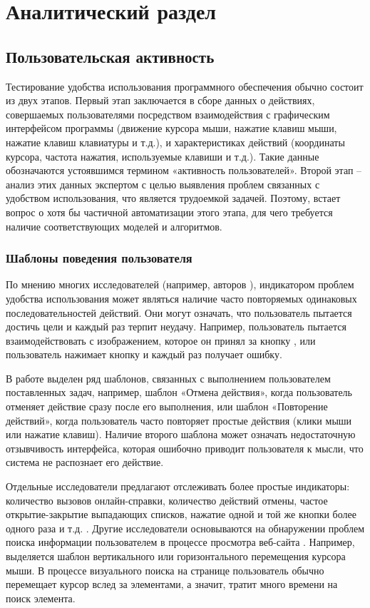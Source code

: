 \chapter{Аналитический раздел}
\label{cha:analysis}

\section{Пользовательская активность}

Тестирование удобства использования программного обеспечения обычно состоит из двух этапов. Первый этап заключается в сборе данных о действиях, совершаемых пользователями посредством взаимодействия с графическим интерфейсом программы (движение курсора мыши, нажатие клавиш мыши, нажатие клавиш клавиатуры и т.д.), и характеристиках действий (координаты курсора, частота нажатия, используемые клавиши и т.д.). Такие данные обозначаются устоявшимся термином «активность пользователей». Второй этап – анализ этих данных экспертом с целью выявления проблем связанных с удобством использования, что является трудоемкой задачей. Поэтому, встает вопрос о хотя бы частичной автоматизации этого этапа, для чего требуется наличие соответствующих моделей и алгоритмов.

\subsection{Шаблоны поведения пользователя}
По мнению многих исследователей (например, авторов \cite{1,4,5,6}), индикатором проблем удобства использования может являться наличие часто повторяемых одинаковых последовательностей действий. Они могут означать, что пользователь пытается достичь цели и каждый раз терпит неудачу. Например, пользователь пытается взаимодействовать с изображением, которое он принял за кнопку \cite{1}, или пользователь нажимает кнопку и каждый раз получает ошибку.

В работе \cite{4} выделен ряд шаблонов, связанных с выполнением пользователем поставленных задач, например, шаблон «Отмена действия», когда пользователь отменяет действие сразу после его выполнения, или шаблон «Повторение действий», когда пользователь часто повторяет простые действия (клики мыши или нажатие клавиш). Наличие второго шаблона может означать недостаточную отзывчивость интерфейса, которая ошибочно приводит пользователя к мысли, что система не распознает его действие.

Отдельные исследователи предлагают отслеживать более простые индикаторы: количество вызовов онлайн-справки, количество действий отмены, частое открытие-закрытие выпадающих списков, нажатие одной и той же кнопки более одного раза и т.д. \cite{5}. Другие исследователи основываются на обнаружении проблем поиска информации пользователем в процессе просмотра веб-сайта \cite{6}. Например, выделяется шаблон вертикального или горизонтального перемещения курсора мыши. В процессе визуального поиска на странице пользователь обычно перемещает курсор вслед за элементами, а значит, тратит много времени на поиск элемента.

